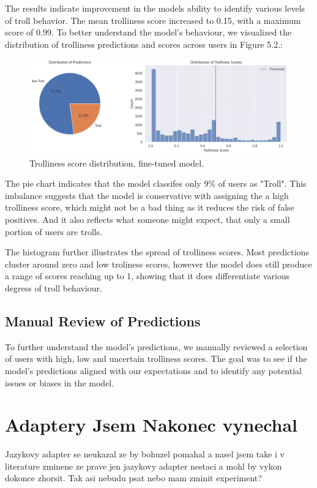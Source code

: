 \documentclass[twoside]{ctuthesis}
\theoremstyle{plain}
\theoremstyle{definition}
\theoremstyle{note}
\begin{document}
The results indicate improvement in the models ability to identify various levels of troll behavior. The mean trolliness score increased to 0.15, with a maximum score of 0.99. To better understand the model's behaviour, we visualized the distribution of trolliness predictions and scores across users in Figure 5.2.:\par

\begin{figure}[htbp]
	\centering
	\includegraphics[scale=0.35]{figures/distribution_fine_tuned.png}
	\caption{Trolliness score distribution, fine-tuned model.}
	\label{fig:fine_tune}
\end{figure}

The pie chart indicates that the model classifes only 9\% of users as "Troll". This imbalance suggests that the model is conservative with assigning the a high trolliness score, which might not be a bad thing as it reduces the risk of false positives. And it also reflects what someone might expect, that only a small portion of users are trolls.\par
The histogram further illustrates the spread of trolliness scores. Most predictions cluster around zero and low troliness scores, however the model does still produce a range of scores reaching up to 1, showing that it does differentiate various degress of troll behaviour.

\subsection{Manual Review of Predictions}
To further understand the model's predictions, we manually reviewed a selection of users with high, low and uncertain trolliness scores. The goal was to see if the model's predictions aligned with our expectations and to identify any potential issues or biases in the model.\par

\section{Adaptery Jsem Nakonec vynechal}
Jazykovy adapter se neukazal ze by bohuzel pomahal a nasel jsem take i v literature zminene ze prave jen jazykovy adapter nestaci a mohl by vykon dokonce zhorsit. Tak asi nebudu psat nebo mam zminit experiment?
\end{document}
